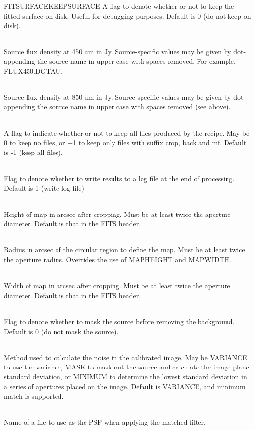 \documentclass[twoside,11pt]{article}
\renewcommand{\_}{\texttt{\symbol{95}}}
\newcommand{\sstsubsection}[1]{ \item[{#1}] \mbox{} \\}
\newcommand{\sstsubsection}[1]{\item[{#1}]}
\begin{document}
{{{         FITSURFACE\_KEEPSURFACE
      }{
         A flag to denote whether or not to keep the fitted surface on
         disk. Useful for debugging purposes. Default is 0 (do not keep
         on disk).
      }
      \sstsubsection{
         FLUX\_450
      }{
         Source flux density at 450 um in Jy. Source-specific values may
         be given by dot-appending the source name in upper case with
         spaces removed. For example, FLUX\_450.DGTAU.
      }
      \sstsubsection{
         FLUX\_850
      }{
         Source flux density at 850 um in Jy. Source-specific values may
         be given by dot-appending the source name in upper case with
         spaces removed (see above).
      }
      \sstsubsection{
         KEEPFILES
      }{
         A flag to indicate whether or not to keep all files produced by
         the recipe. May be 0 to keep no files, or $+$1 to keep only files
         with suffix \_crop, \_back and \_mf. Default is -1 (keep all
         files).
      }
      \sstsubsection{
         LOGFILE
      }{
         Flag to denote whether to write results to a log file at the
         end of processing. Default is 1 (write log file).
      }
      \sstsubsection{
         MAP\_HEIGHT
      }{
         Height of map in arcsec after cropping. Must be at least twice
         the aperture diameter. Default is that in the FITS header.
      }
      \sstsubsection{
         MAP\_RADIUS
      }{
         Radius in arcsec of the circular region to define the map. Must
         be at least twice the aperture radius. Overrides the use of
         MAP\_HEIGHT and MAP\_WIDTH.
      }
      \sstsubsection{
         MAP\_WIDTH
      }{
         Width of map in arcsec after cropping. Must be at least twice
         the aperture diameter. Default is that in the FITS header.
      }
      \sstsubsection{
         MASK\_SOURCE
      }{
         Flag to denote whether to mask the source before removing the
         background. Default is 0 (do not mask the source).
      }
      \sstsubsection{
         NOISE\_METHOD
      }{
         Method used to calculate the noise in the calibrated image. May
         be VARIANCE to use the variance, MASK to mask out the source
         and calculate the image-plane standard deviation, or MINIMUM to
         determine the lowest standard deviation in a series of
         apertures placed on the image. Default is VARIANCE, and minimum
         match is supported.
      }
      \sstsubsection{
         PSF\_MATCHFILTER
      }{
         Name of a file to use as the PSF when applying the matched
         filter.
      }
}}
\end{document}
